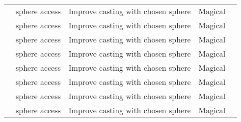 \begin{longtabuwrapper}
\begin{longtabu}{>{\lcol}p{11em} >{\lcol}p{15em} >{\lcol}X >{\lcol}p{8em} >{\lcol}p{3em}}
           &  sphere access   & Improve casting with chosen sphere           & Magical &    \\
           &  sphere access   & Improve casting with chosen sphere           & Magical &    \\
          &  sphere access  & Improve casting with chosen sphere           & Magical &   \\
              &  sphere access      & Improve casting with chosen sphere           & Magical &       \\
         &  sphere access & Improve casting with chosen sphere           & Magical &  \\
         &  sphere access & Improve casting with chosen sphere           & Magical &  \\
         &  sphere access & Improve casting with chosen sphere           & Magical &  \\
         &  sphere access & Improve casting with chosen sphere           & Magical &  \\


\end{longtabu}
\end{longtabuwrapper}
